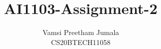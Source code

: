 \documentclass[journal,12pt,twocolumn]{IEEEtran}
\DeclareMathOperator*{\Res}{Res}
\begin{document}
\newcommand{\BEQA}{\begin{eqnarray}}
\newcommand{\EEQA}{\end{eqnarray}}
\newcommand{\define}{\stackrel{\triangle}{=}}

\raggedbottom
\setlength{\parindent}{0pt}
\providecommand{\mbf}{\mathbf}
\providecommand{\pr}[1]{\ensuremath{\Pr\left(#1\right)}}\newcommand*{\permcomb}[4][0mu]{{{}^{#3}\mkern#1#2_{#4}}}
\newcommand*{\perm}[1][-3mu]{\permcomb[#1]{P}}
\newcommand*{\comb}[1][-1mu]{\permcomb[#1]{C}}
\providecommand{\qfunc}[1]{\ensuremath{Q\left(#1\right)}}
\providecommand{\sbrak}[1]{\ensuremath{{}\left[#1\right]}}
\providecommand{\lsbrak}[1]{\ensuremath{{}\left[#1\right.}}
\providecommand{\rsbrak}[1]{\ensuremath{{}\left.#1\right]}}
\providecommand{\brak}[1]{\ensuremath{\left(#1\right)}}
\providecommand{\lbrak}[1]{\ensuremath{\left(#1\right.}}
\providecommand{\rbrak}[1]{\ensuremath{\left.#1\right)}}
\providecommand{\cbrak}[1]{\ensuremath{\left\{#1\right\}}}
\providecommand{\lcbrak}[1]{\ensuremath{\left\{#1\right.}}
\providecommand{\rcbrak}[1]{\ensuremath{\left.#1\right\}}}
\theoremstyle{remark}
\newtheorem{rem}{Remark}
\newcommand{\sgn}{\mathop{\mathrm{sgn}}}
\providecommand{\abs}[1]{\vert#1\vert}
\providecommand{\res}[1]{\Res\displaylimits_{#1}} 
\providecommand{\norm}[1]{\lVert#1\rVert}
\providecommand{\mtx}[1]{\mathbf{#1}}
\providecommand{\mean}[1]{E[ #1 ]}
\providecommand{\fourier}{\overset{\mathcal{F}}{ \rightleftharpoons}}
\providecommand{\system}{\overset{\mathcal{H}}{ \longleftrightarrow}}
\newcommand{\solution}{\noindent \textbf{Solution: }}
\newcommand{\cosec}{\,\text{cosec}\,}
\providecommand{\dec}[2]{\ensuremath{\overset{#1}{\underset{#2}{\gtrless}}}}
\newcommand{\myvec}[1]{\ensuremath{\begin{pmatrix}#1\end{pmatrix}}}
\newcommand{\mydet}[1]{\ensuremath{\begin{vmatrix}#1\end{vmatrix}}}
\makeatletter
{}
\makeatother
\let\StandardTheFigure\thefigure
\let\vec\mathbf
\renewcommand{\thefigure}{\theproblem}
\def\putbox#1#2#3{\makebox[0in][l]{\makebox[#1][l]{}\raisebox{\baselineskip}[0in][0in]{\raisebox{#2}[0in][0in]{#3}}}}
     \def\rightbox#1{\makebox[0in][r]{#1}}
     \def\centbox#1{\makebox[0in]{#1}}
     \def\topbox#1{\raisebox{-\baselineskip}[0in][0in]{#1}}
     \def\midbox#1{\raisebox{-0.5\baselineskip}[0in][0in]{#1}}
\vspace{3cm}
\title{AI1103-Assignment-2}
\author{Vamsi Preetham Jumala\\CS20BTECH11058}
\maketitle
\newpage
\bigskip
\renewcommand{\thefigure}{\theenumi}
\renewcommand{\thetable}{\theenumi}
\end{document}
